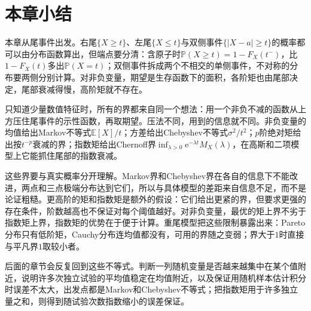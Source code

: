\section{本章小结}
\label{sec:tail-summary}

本章从尾事件出发。右尾$\{X\geq t\}$、左尾$\{X\leq t\}$与双侧事件$\{\lvert X-a\rvert\geq t\}$的概率都可以由分布函数算出，但端点要分清：含原子时$\mathbb{P}(X\geq t)=1-F_X(t^-)$，比$1-F_X(t)$多出$\mathbb{P}(X=t)$；双侧事件拆成两个不相交的单侧事件，不对称的分布要两侧分别计算。对非负变量，期望是生存函数下的面积，各阶矩也由尾部决定，尾部衰减得慢，高阶矩就不存在。

只知道少量数值特征时，所有的界都来自同一个想法：用一个非负不减的函数从上方压住尾事件的示性函数，再取期望。压法不同，用到的信息就不同。非负变量的均值给出Markov不等式$\mathbb{E}[X]/t$；方差给出Chebyshev不等式$\sigma^2/t^2$；$p$阶绝对矩给出按$t^{-p}$衰减的界；指数矩给出Chernoff界$\inf_{\lambda>0}\mathrm{e}^{-\lambda t}M_X(\lambda)$，在高斯和二项模型上它能抓住尾部的指数衰减。

这些界要与真实概率分开理解。Markov界和Chebyshev界在各自的信息下不能改进，两点和三点极端分布达到它们，所以与具体模型的差距来自信息不足，而不是论证粗糙。更高阶的矩和指数矩是额外的假设：它们给出更紧的界，但要求更强的存在条件，阶数越高也不保证对每个阈值越好。对非负变量，最优的矩上界不劣于指数矩上界，指数矩的优势在于便于计算。重尾模型把这些限制暴露出来：Pareto分布只有低阶矩，Cauchy分布连均值都没有，可用的界随之变弱；界大于$1$时直接与平凡界$1$取较小者。

后面的章节会反复回到这些不等式。判断一列随机变量是否越来越集中在某个值附近，说明许多次独立试验的平均值稳定在均值附近，以及保证用随机样本估计积分时误差不太大，出发点都是Markov和Chebyshev不等式；把指数矩用于许多独立量之和，则得到随试验次数指数缩小的误差保证。
